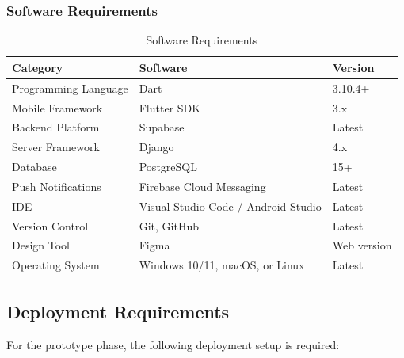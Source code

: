 \subsubsection{Software Requirements}

\begin{table}[H]
\centering
\caption{Software Requirements}
\begin{tabularx}{\textwidth}{|l|X|l|}
\hline
\textbf{Category} & \textbf{Software} & \textbf{Version} \\
\hline
Programming Language & Dart & 3.10.4+ \\
\hline
Mobile Framework & Flutter SDK & 3.x \\
\hline
Backend Platform & Supabase & Latest \\
\hline
Server Framework & Django & 4.x \\
\hline
Database & PostgreSQL & 15+ \\
\hline
Push Notifications & Firebase Cloud Messaging & Latest \\
\hline
IDE & Visual Studio Code / Android Studio & Latest \\
\hline
Version Control & Git, GitHub & Latest \\
\hline
Design Tool & Figma & Web version \\
\hline
Operating System & Windows 10/11, macOS, or Linux & Latest \\
\hline
\end{tabularx}
\end{table}

\subsection{Deployment Requirements}

For the prototype phase, the following deployment setup is required:

